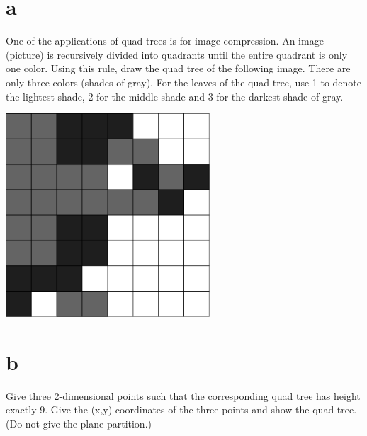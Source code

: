 \documentclass[12pt]{article}
\begin{document}
\begin{enumerate} 
\part{a} One of the applications of quad trees is for image
compression.  An image (picture) is recursively divided into quadrants
until the entire quadrant is only one color.  Using this rule,
draw the quad tree of the following image.  There are only three
colors (shades of gray).  For the leaves of the quad tree, use 1
to denote the lightest shade, 2 for the middle shade and 3 for the
darkest shade of gray.
\begin{center}
  \includegraphics[width=3in]{QuadTreePic}
\end{center}


\part{b} Give three 2-dimensional points such that the corresponding
quad tree has height exactly 9.  Give the (x,y) coordinates of the
three points and show the quad tree.  (Do not give the plane
partition.)


\end{enumerate}
\end{document}
